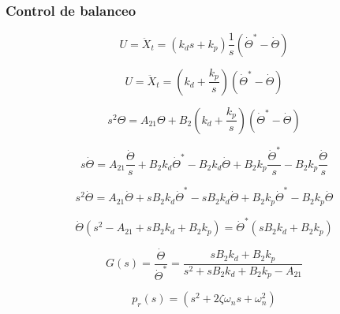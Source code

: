 \documentclass{article}
\begin{document}
       
        \subsubsection{Control de balanceo}
            \begin{equation}
                U=\ddot{X}_t= \left(k_d s+k_p\right) \frac{1}{s} \left(\dot{\Theta}^*- \dot{\Theta}\right)
            \end{equation}

            \begin{equation}
                U=\ddot{X}_t= \left(k_d +\frac{k_p}{s}\right) \left(\dot{\Theta}^*- \dot{\Theta}\right)
            \end{equation}
            
            \begin{equation}
                 s^2 \Theta = A_{21} \Theta + B_{2} \left(k_d +\frac{k_p}{s}\right) \left(\dot{\Theta}^*- \dot{\Theta}\right)
            \end{equation}

            \begin{equation}
                s \dot{\Theta} = A_{21} \frac{\dot{\Theta}}{s} + B_{2} k_d \dot{\Theta}^* - B_{2} k_d \dot{\Theta}  + B_{2} k_p \frac{\dot{\Theta}^*}{s}  - B_{2} k_p \frac{\dot{\Theta}}{s} 
            \end{equation}

            \begin{equation}
                s^2 \dot{\Theta} = A_{21} \dot{\Theta} + s B_{2} k_d \dot{\Theta}^* - s B_{2} k_d \dot{\Theta}  + B_{2} k_p \dot{\Theta}^* - B_{2} k_p \dot{\Theta}
            \end{equation}

            \begin{equation}
                \dot{\Theta}(s^2 - A_{21} + s B_{2} k_d + B_{2} k_p) = \dot{\Theta}^*(s B_{2} k_d + B_{2} k_p)
            \end{equation}

            \begin{equation}
                G(s)=\frac{\dot{\Theta}}{\dot{\Theta}^*}=\frac{s B_{2} k_d + B_{2} k_p}{s^2 + s B_{2} k_d + B_{2} k_p - A_{21}}
            \end{equation}

            \begin{equation}
                p_r(s)=(s^2+2\zeta\omega_n s+\omega_n^2)
            \end{equation}
\end{document}
